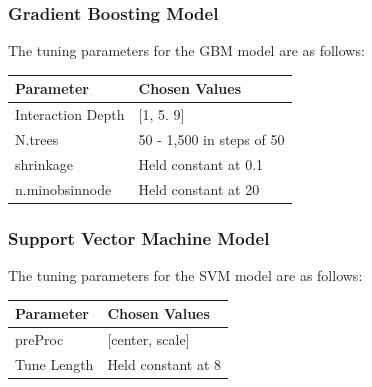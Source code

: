     \subsubsection{Gradient Boosting Model}
    The tuning parameters for the GBM model are as follows:
        \begin{center}
            \begin{tabular}{|l |l|}
            \hline
             \textbf{Parameter} & \textbf{Chosen Values} \\
             \hline\hline
             Interaction Depth & [1, 5. 9] \\
             \hline
             N.trees & 50 - 1,500 in steps of 50 \\
             \hline
             shrinkage & Held constant at 0.1 \\ 
             \hline
             n.minobsinnode & Held constant at 20 \\
             \hline
            \end{tabular}
        \end{center}
        
        \subsubsection{Support Vector Machine Model}
        The tuning parameters for the SVM model are as follows:
        \begin{center}
            \begin{tabular}{|l |l|}
            \hline
             \textbf{Parameter} & \textbf{Chosen Values} \\
             \hline\hline
             preProc & [center, scale] \\
             \hline
             Tune Length & Held constant at 8\\
             \hline
            \end{tabular}
        \end{center}